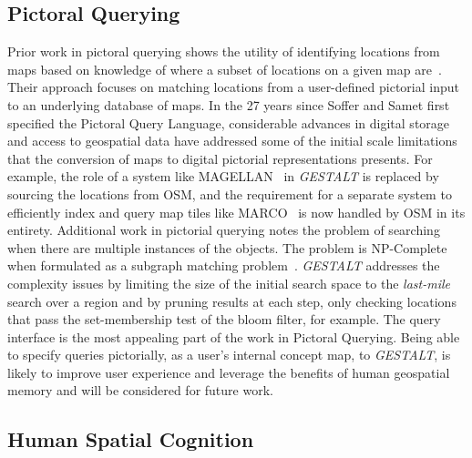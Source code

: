 \subsection{Pictoral Querying}
Prior work in pictoral querying shows the utility of identifying locations from maps based on knowledge of where a subset of locations on a given map are~\cite{Soffer1997}. 
Their approach focuses on matching locations from a user-defined pictorial input to an underlying database of maps. In the 27 years since Soffer and Samet first specified the Pictoral Query Language, considerable advances in digital storage and access to geospatial data have addressed some of the initial scale limitations that the conversion of maps to digital pictorial representations presents. For example, the role of a system like MAGELLAN~\cite{Samet1998} in \textit{GESTALT} is replaced by sourcing the locations from OSM, and the requirement for a separate system to efficiently index and query map tiles like MARCO~\cite{Samet1996} is now handled by OSM in its entirety. 
Additional work in pictorial querying notes the problem of searching when there are multiple instances of the objects. The problem is NP-Complete when formulated as a subgraph matching problem~\cite{Folkers2000}. 
\textit{GESTALT} addresses the complexity issues by limiting the size of the initial search space to the \textit{last-mile} search over a region and by pruning results at each step, only checking locations that pass the set-membership test of the bloom filter, for example. 
The query interface is the most appealing part of the work in Pictoral Querying. Being able to specify queries pictorially, as a user's internal concept map, to \textit{GESTALT}, is likely to improve user experience and leverage the benefits of human geospatial memory and will be considered for future work. 

\subsection{Human Spatial Cognition}


